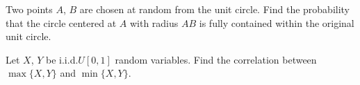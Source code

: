 \begin{problem}[Handout 17, \# 18]
  Two points \(A\), \(B\) are chosen at random from the unit circle. Find
  the probability that the circle centered at \(A\) with radius \(AB\) is
  fully contained within the original unit circle.
\end{problem}
\begin{solution}
\end{solution}
\newpage

\begin{problem}[Handout 17, \# 19]
  Let \(X\), \(Y\) be i.i.d.\@ \(U[0,1]\) random variables. Find the
  correlation between \(\max\{X,Y\}\) and \(\min\{X,Y\}\).
\end{problem}
\begin{solution}
\end{solution}

